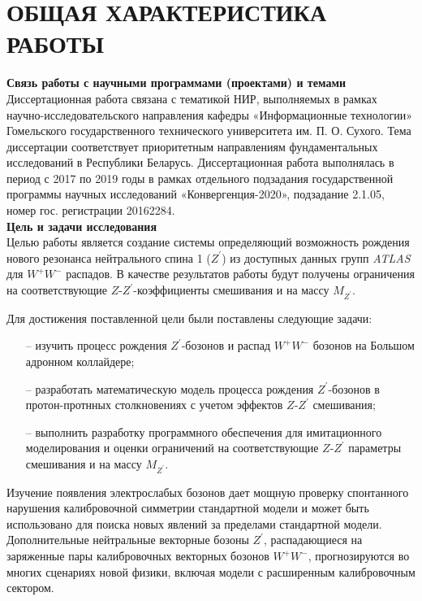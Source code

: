 \chapter*{ОБЩАЯ ХАРАКТЕРИСТИКА РАБОТЫ}
\textbf{Связь работы с научными программами (проектами) и темами}\\

Диссертационная работа связана с тематикой НИР, выполняемых в рамках научно-исследовательского направления кафедры «Информационные технологии» Гомельского государственного технического университета им. П. О. Сухого.
Тема диссертации соответствует приоритетным направлениям
фундаментальных исследований в Республики Беларусь. Диссертационная
работа выполнялась в период с 2017 по 2019 годы в рамках отдельного
подзадания государственной программы научных исследований
«Конвергенция-2020», подзадание 2.1.05, номер гос. регистрации 20162284.
\\

\textbf{Цель и задачи исследования}\\

Целью работы является создание системы определяющий возможность рождения нового резонанса нейтрального спина 1 (${Z}^{\prime}$) 
из доступных данных групп \textit{ATLAS} для ${W}^{+}{W}^{-}$ распадов. В качестве результатов работы будут получены 
ограничения на соответствующие $Z$-${Z}^{\prime}$-коэффициенты смешивания и на массу $M_{Z^\prime}$.

Для достижения поставленной цели были поставлены следующие задачи:

\begin{itemize}
	\item[--] изучить процесс рождения ${Z}^{\prime}$-бозонов и распад ${W}^{+}{W}^{-}$ бозонов на Большом адронном коллайдере;
	
	\item[--] разработать математическую модель процесса рождения ${Z}^{\prime}$-бозонов в протон-протнных столкновениях с учетом эффектов $Z$-${Z}^{\prime}$ смешивания;
	
	\item[--] выполнить разработку программного обеспечения для имитационного моделирования и оценки ограничений на соответствующие $Z$-${Z}^{\prime}$ параметры смешивания и на массу $M_{Z^\prime}$.
	
\end{itemize}

Изучение появления электрослабых бозонов дает мощную проверку спонтанного нарушения 
калибровочной симметрии стандартной модели и может быть использовано для поиска новых явлений за пределами стандартной модели. 
Дополнительные нейтральные векторные бозоны ${Z}^{\prime}$, распадающиеся на заряженные пары калибровочных векторных бозонов ${W}^{+}{W}^{-}$, 
прогнозируются во многих сценариях новой физики, включая модели с расширенным калибровочным сектором.
\\

